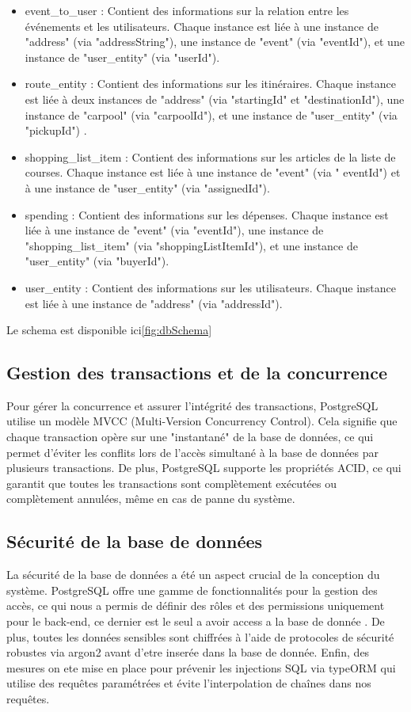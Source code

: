 \begin{itemize}
    \item event\_to\_user : Contient des informations sur la relation entre les événements et les utilisateurs.
    Chaque instance est liée à une instance de "address" (via "addressString"), une instance de "event" (via "eventId"), et une instance de "user\_entity" (via "userId").
    \item route\_entity : Contient des informations sur les itinéraires.
    Chaque instance est liée à deux instances de "address" (via "startingId" et "destinationId"), une instance de "carpool" (via "carpoolId"), et une instance de "user\_entity" (via "pickupId") .
    \item shopping\_list\_item : Contient des informations sur les articles de la liste de courses.
    Chaque instance est liée à une instance de "event" (via " eventId") et à une instance de "user\_entity" (via "assignedId").
    \item spending : Contient des informations sur les dépenses.
    Chaque instance est liée à une instance de "event" (via "eventId"), une instance de "shopping\_list\_item" (via "shoppingListItemId"), et une instance de "user\_entity" (via "buyerId").
    \item user\_entity : Contient des informations sur les utilisateurs.
    Chaque instance est liée à une instance de "address" (via "addressId").
\end{itemize}

Le schema est disponible ici\ref{fig:dbSchema}%

\subsection{Gestion des transactions et de la concurrence}\label{subsec:transaction-concurrency}
Pour gérer la concurrence et assurer l'intégrité des transactions, PostgreSQL utilise un modèle MVCC (Multi-Version Concurrency Control).
Cela signifie que chaque transaction opère sur une "instantané" de la base de données, ce qui permet d'éviter les conflits lors de l'accès simultané à la base de données par plusieurs transactions.
De plus, PostgreSQL supporte les propriétés ACID, ce qui garantit que toutes les transactions sont complètement exécutées ou complètement annulées, même en cas de panne du système.

\subsection{Sécurité de la base de données}\label{subsec:database-security}
La sécurité de la base de données a été un aspect crucial de la conception du système.
PostgreSQL offre une gamme de fonctionnalités pour la gestion des accès, ce qui nous a permis de définir des rôles et des permissions uniquement pour le back-end, ce dernier est le seul a avoir access a la base de donnée .
De plus, toutes les données sensibles sont chiffrées à l'aide de protocoles de sécurité robustes via argon2 avant d'etre inserée dans la base de donnée.
Enfin, des mesures on ete mise en place pour prévenir les injections SQL via typeORM qui utilise des requêtes paramétrées et évite l'interpolation de chaînes dans nos requêtes.

